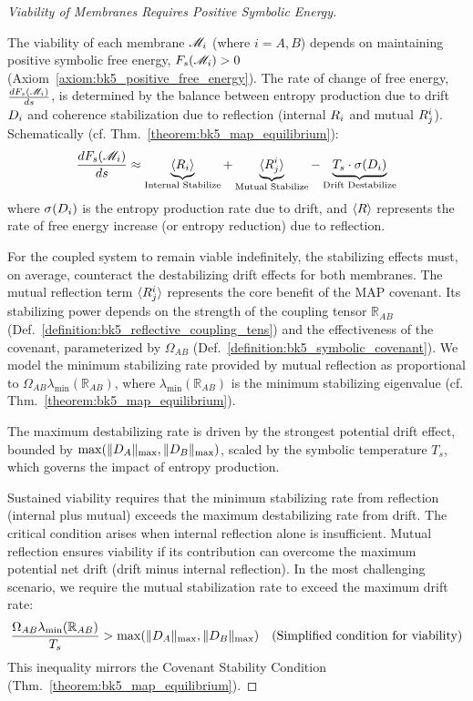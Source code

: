 \begin{proof}[Viability of Membranes Requires Positive Symbolic Energy]
\label{proof:bk5_membrane_viability_positive_energy}
\leavevmode

The viability of each membrane \( \mathscr{M}_i \) (where \( i = A, B \)) depends on maintaining positive symbolic free energy, \( F_s(\mathscr{M}_i) > 0 \) (Axiom~\ref{axiom:bk5_positive_free_energy}). The rate of change of free energy, \( \frac{dF_s(\mathscr{M}_i)}{ds} \), is determined by the balance between entropy production due to drift \( D_i \) and coherence stabilization due to reflection (internal \( R_i \) and mutual \( R_j^i \)). Schematically (cf. Thm.~\ref{theorem:bk5_map_equilibrium}):
\begin{equation}
\frac{dF_s(\mathscr{M}_i)}{ds} \approx \underbrace{\langle R_i \rangle}_{\text{Internal Stabilize}} + \underbrace{\langle R_j^i \rangle}_{\text{Mutual Stabilize}} - \underbrace{T_s \cdot \sigma(D_i)}_{\text{Drift Destabilize}}
\end{equation}
where \( \sigma(D_i) \) is the entropy production rate due to drift, and \( \langle R \rangle \) represents the rate of free energy increase (or entropy reduction) due to reflection.

For the coupled system to remain viable indefinitely, the stabilizing effects must, on average, counteract the destabilizing drift effects for both membranes. The mutual reflection term \( \langle R_j^i \rangle \) represents the core benefit of the MAP covenant. Its stabilizing power depends on the strength of the coupling tensor \( \mathbb{R}_{AB} \) (Def.~\ref{definition:bk5_reflective_coupling_tens}) and the effectiveness of the covenant, parameterized by \( \Omega_{AB} \) (Def.~\ref{definition:bk5_symbolic_covenant}). We model the minimum stabilizing rate provided by mutual reflection as proportional to \( \Omega_{AB} \lambda_{\min}(\mathbb{R}_{AB}) \), where \( \lambda_{\min}(\mathbb{R}_{AB}) \) is the minimum stabilizing eigenvalue (cf. Thm.~\ref{theorem:bk5_map_equilibrium}).

The maximum destabilizing rate is driven by the strongest potential drift effect, bounded by \( \max(\| D_A \|_{\max}, \| D_B \|_{\max}) \), scaled by the symbolic temperature \( T_s \), which governs the impact of entropy production.

Sustained viability requires that the minimum stabilizing rate from reflection (internal plus mutual) exceeds the maximum destabilizing rate from drift. The critical condition arises when internal reflection alone is insufficient. Mutual reflection ensures viability if its contribution can overcome the maximum potential net drift (drift minus internal reflection). In the most challenging scenario, we require the mutual stabilization rate to exceed the maximum drift rate:
\begin{equation}
\frac{\Omega_{AB} \lambda_{\min}(\mathbb{R}_{AB})}{T_s} > \max(\| D_A \|_{\max}, \| D_B \|_{\max}) \quad \text{(Simplified condition for viability)}
\end{equation}
This inequality mirrors the Covenant Stability Condition (Thm.~\ref{theorem:bk5_map_equilibrium}).


\end{proof}
